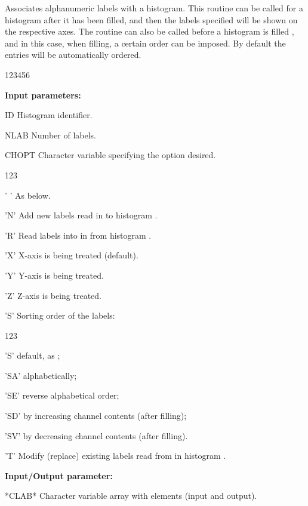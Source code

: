 
\Action 
Associates alphanumeric labels with a histogram.
This routine can be called for a histogram after it has been filled,
and then the labels specified will be shown on the respective axes.
The routine can also be called before a histogram is filled ,
and in this case, when filling, a certain order can be imposed.
By default the entries will be automatically ordered.

\begin{DLttc}{123456}
\item[{\rm\bf Input parameters:}]
\item[ID]     Histogram identifier.
\item[NLAB]   Number of labels.
\item[CHOPT]  Character variable specifying the option desired.
              \begin{DLttc}{123}
                \item[' '] As  below.
                \item['N'] Add  new labels read in 
                           to histogram .
                \item['R'] Read  labels into in 
                           from histogram .
                \item['X'] X-axis is being treated (default).
                \item['Y'] Y-axis is being treated.
                \item['Z'] Z-axis is being treated.
                \item['S'] Sorting order of the labels:
                           \begin{DLttc}{123}
                             \item['S']  default, as ;
                             \item['SA'] alphabetically;
                             \item['SE'] reverse alphabetical order;
                             \item['SD'] by increasing channel contents
                                         (after filling);
                             \item['SV'] by decreasing channel contents
                                         (after filling).
                           \end{DLttc}
                \item['T'] Modify (replace)  existing labels read from 
                            in histogram .
              \end{DLttc}
\item[{\rm\bf Input/Output parameter:}]
\item[*CLAB*] Character variable array with
               elements (input and output).
\end{DLttc}

